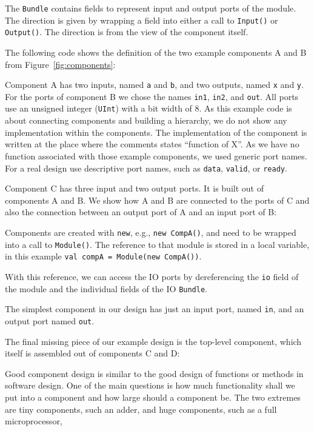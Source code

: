 \documentclass[%
    10pt,
    headinclude, footexclude,
    openright, %
    notitlepage,
    cleardoubleempty,
    headsepline,
    pointlessnumbers,
    bibtotoc, idxtotoc,
    ]{scrbook}
\newcommand{\code}[1]{{\small{\texttt{#1}}}}
\begin{document}
The \code{Bundle} contains fields to represent input and output ports of
the module. The direction is given by wrapping a field into either a call to \code{Input()}
or \code{Output()}. The direction is from the view of the component itself.

The following code shows the definition of the two example components A and B from
Figure~\ref{fig:components}:


\noindent Component A has two inputs, named \code{a} and \code{b}, and two
outputs, named \code{x} and \code{y}. For the ports of component B
we chose the names \code{in1}, \code{in2}, and \code{out}.
All ports use an unsigned integer (\code{UInt}) with a bit width of 8.
As this example code is about connecting components and building a
hierarchy, we do not show any implementation within the components.
The implementation of the component is written at the place where
the comments states ``function of X''.
As we have no function associated with those example components,
we used generic port names. For a real design use descriptive
port names, such as \code{data}, \code{valid}, or \code{ready}.

Component C has three input and two output ports. It is built out of
components A and B. We show how A and B are connected to the ports
of C and also the connection between an output port of A and an
input port of B:


Components are created with \code{new}, e.g., \code{new CompA()}, and need to be wrapped
into a call to \code{Module()}. The reference to that module is stored in a local variable,
in this example \code{val compA = Module(new CompA())}.

With this reference, we can access the IO ports by dereferencing the \code{io} field of the module
and the individual fields of the IO \code{Bundle}.

The simplest component in our design has just an input port, named \code{in}, and
an output port named \code{out}.


The final missing piece of our example design is the top-level component, which itself
is assembled out of components C and D:


Good component design is similar to the good design of functions or methods in
software design. One of the main questions is how much functionality shall we put into
a component and how large should a component be. The two extremes are tiny
components, such an adder, and huge components, such as a full microprocessor,
\end{document}
